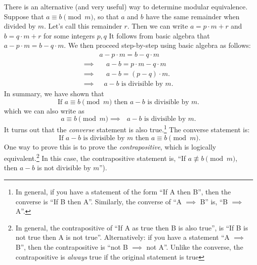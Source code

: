 There is an alternative (and very useful) way to determine modular equivalence.
Suppose that $a \equiv b \pmod{m}$, so that $a$ and $b$ have the same remainder when divided by $m$. Let's call this remainder $r$. Then we can write  $a = p \cdot m + r$ and $b = q \cdot m + r$ for some integers $p,q$ It follows from basic algebra that $a - p \cdot m =b - q \cdot m$. We then proceed step-by-step using basic algebra as follows:
\begin{align*}
&a - p \cdot m = b - q \cdot m \\
\implies &\quad a - b = p \cdot m - q \cdot m \\
\implies &\quad a - b = (p - q) \cdot m. \\
\implies &\mbox{ $a - b$ is divisible by $m$}.
\end{align*}
In summary, we have shown that
\[\text{If } a \equiv b \pmod{m}  \text{ then } a - b \text{ is divisible by } m.\]
which we can also write as
\[a \equiv b \pmod{m} \implies \mbox{ $a - b$ is divisible by $m$.}\]
It turns out that the \emph{converse} statement is also true.\footnote{In general, if you have a statement of the form ``If A then B'', then the converse  is ``If B then A''.  Similarly, the converse of ``A $\implies$ B'' is, ``B $\implies$ A''.}  The converse statement is: 
\[\mbox{ If  $a - b$ is divisible by $m$  then }a \equiv b \pmod{m}. \]
One way to prove this is to prove the \emph{contrapositive},  which is logically equivalent.\footnote{In general, the contrapositive of ``If A as true then B is also true'',  is ``If B is not true then A is not true''.  Alternatively: if you have a statement ``A $\implies$ B'', then the contrapositive is ``not B $\implies$ not A''. Unlike the converse, the contrapositive is \emph{always} true if the original statement is true} In this case, the contrapositive statement is, ``If $a \not\equiv b \pmod{m}$, then $a-b$ is not divisible by $m$'').

